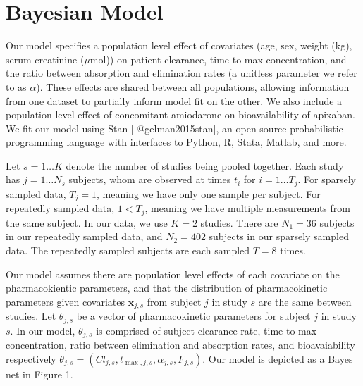 \section{Bayesian Model}


Our model specifies a population level effect of covariates (age, sex, weight (kg), serum creatinine ($\mu \mbox{mol}$)) on patient clearance, time to max concentration, and the ratio between absorption and elimination rates (a unitless parameter we refer to as $\alpha$). These effects are shared between all populations, allowing information from one dataset to partially inform model fit on the other.  We also include a population level effect of concomitant amiodarone on bioavailability of apixaban.  We fit our model using Stan [-@gelman2015stan], an open source probabilistic programming language with interfaces to Python, R, Stata, Matlab, and more.

Let $s = 1 \dots K$ denote the number of studies being pooled together.  Each study has $j = 1 \dots N_s$ subjects, whom are observed at times $t_i$ for $i = 1 \dots T_j$.  For sparsely sampled data, $T_j=1$, meaning we have only one sample per subject.  For repeatedly sampled data, $1<T_j$, meaning we have multiple measurements from the same subject.  In our data, we use $K=2$ studies.  There are $N_1=36$ subjects in our repeatedly sampled data, and $N_2=402$ subjects in our sparsely sampled data.  The repeatedly sampled subjects are each sampled $T=8$ times.

Our model assumes there are population level effects of each covariate on the pharmacokientic parameters, and that the distribution of pharmacokinetic parameters given covariates $\mathbf{x}_{j, s}$ from subject $j$ in study $s$ are the same between studies.  Let $\theta_{j, s}$ be a vector of pharmacokinetic parameters for subject $j$ in study $s$.  In our model, $\theta_{j, s}$ is comprised of subject clearance rate, time to max concentration, ratio between elimination and absorption rates, and bioavaiability respectively  $\theta_{j,s} = (Cl_{j, s}, t_{\max, j, s}, \alpha_{j, s}, F_{j, s})$.  Our model is depicted as a Bayes net in Figure 1.

